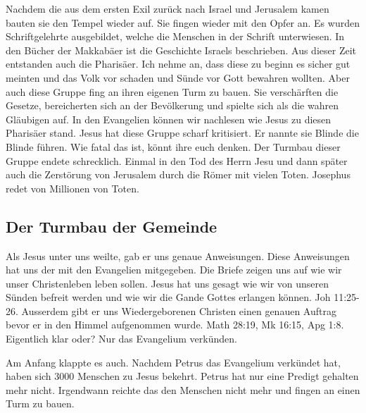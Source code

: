 \documentclass[14pt]{../../inc/mybib}
\begin{document}
    Nachdem die aus dem ersten Exil zurück nach Israel und Jerusalem kamen bauten sie den Tempel wieder auf. Sie fingen wieder mit den Opfer an. Es wurden Schriftgelehrte ausgebildet, welche die Menschen in der Schrift unterwiesen. In den Bücher der Makkabäer ist die Geschichte Israels beschrieben. Aus dieser Zeit entstanden auch die Pharisäer. Ich nehme an, dass diese zu beginn es sicher gut meinten und das Volk vor schaden und Sünde vor Gott bewahren wollten. Aber auch diese Gruppe fing an ihren eigenen Turm zu bauen. Sie verschärften die Gesetze, bereicherten sich an der Bevölkerung und spielte sich als die wahren Gläubigen auf. In den Evangelien können wir nachlesen wie Jesus zu diesen Pharisäer stand. Jesus hat diese Gruppe scharf kritisiert. Er nannte sie Blinde die Blinde führen. Wie fatal das ist, könnt ihre euch denken. Der Turmbau dieser Gruppe endete schrecklich. Einmal in den Tod des Herrn Jesu und dann später auch die Zerstörung von Jerusalem durch die Römer mit vielen Toten. Josephus redet von Millionen von Toten.

    \subsection{Der Turmbau der Gemeinde}
    Als Jesus unter uns weilte, gab er uns genaue Anweisungen. Diese Anweisungen hat uns der \herr{} mit den Evangelien mitgegeben. Die Briefe zeigen uns auf wie wir unser Christenleben leben sollen. Jesus hat uns gesagt wie wir von unseren Sünden befreit werden und wie wir die Gande Gottes erlangen können. Joh 11:25-26. Ausserdem gibt er uns Wiedergeborenen Christen einen genauen Auftrag bevor er in den Himmel aufgenommen wurde. Math 28:19, Mk 16:15, Apg 1:8. Eigentlich klar oder? Nur das Evangelium verkünden.

    Am Anfang klappte es auch. Nachdem Petrus das Evangelium verkündet hat, haben sich 3000 Menschen zu Jesus bekehrt. Petrus hat nur eine Predigt gehalten mehr nicht. Irgendwann reichte das den Menschen nicht mehr und fingen an einen Turm zu bauen. 
    

    
\end{document}
